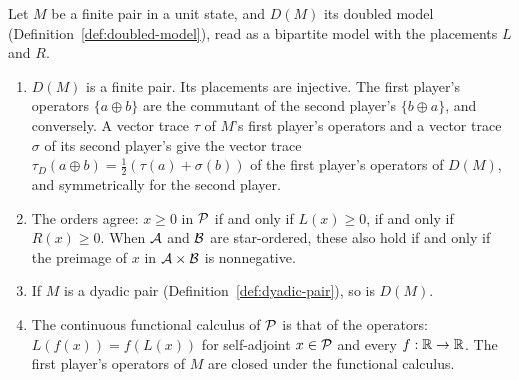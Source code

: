 \begin{lemma}
\label{lem:doubled-model-finite-pair}
\leanok
Let $M$ be a finite pair in a unit state, and $D(M)$ its doubled model
(Definition~\ref{def:doubled-model}), read as a bipartite model with the placements $L$ and $R$.
\begin{enumerate}
  \item $D(M)$ is a finite pair. Its placements are injective. The first player's operators
  $\{a \oplus b\}$ are the commutant of the second player's $\{b \oplus a\}$, and conversely. A
  vector trace $\tau$ of $M$'s first player's operators and a vector trace $\sigma$ of its second
  player's give the vector trace $\tau_D(a \oplus b) = \frac{1}{2}(\tau(a) + \sigma(b))$ of the first
  player's operators of $D(M)$, and symmetrically for the second player.
  \item The orders agree: $x \geq 0$ in $\cal{P}$ if and only if $L(x) \geq 0$, if and only if
  $R(x) \geq 0$. When $\cal{A}$ and $\cal{B}$ are star-ordered, these also hold if and only if
  the preimage of $x$ in $\cal{A} \times \cal{B}$ is nonnegative.
  \item If $M$ is a dyadic pair (Definition~\ref{def:dyadic-pair}), so is $D(M)$.
  \item The continuous functional calculus of $\cal{P}$ is that of the operators: $L(f(x)) =
  f(L(x))$ for self-adjoint $x \in \cal{P}$ and every $f : \R \to \R$. The first player's
  operators of $M$ are closed under the functional calculus.
\end{enumerate}
\end{lemma}

